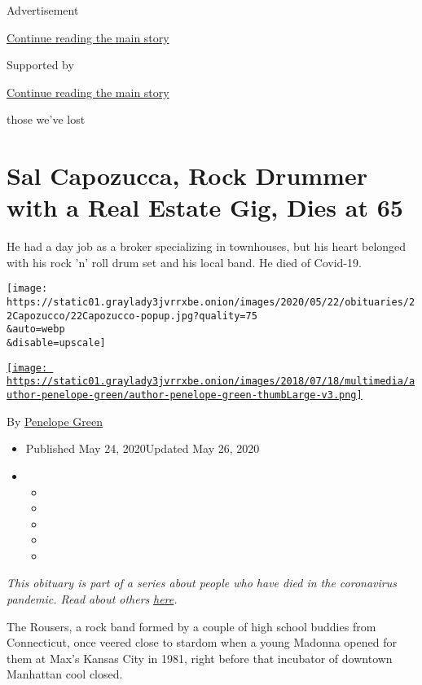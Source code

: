 Advertisement

\protect\hyperlink{after-top}{Continue reading the main story}

Supported by

\protect\hyperlink{after-sponsor}{Continue reading the main story}

those we've lost

\hypertarget{sal-capozucca-rock-drummer-with-a-real-estate-gig-dies-at-65}{%
\section{Sal Capozucca, Rock Drummer with a Real Estate Gig, Dies at
65}\label{sal-capozucca-rock-drummer-with-a-real-estate-gig-dies-at-65}}

He had a day job as a broker specializing in townhouses, but his heart
belonged with his rock 'n' roll drum set and his local band. He died of
Covid-19.

\texttt{[image: https://static01.graylady3jvrrxbe.onion/images/2020/05/22/obituaries/22Capozucco/22Capozucco-popup.jpg?quality=75\\\&auto=webp\\\&disable=upscale]}

\href{https://www.nytimes3xbfgragh.onion/by/penelope-green}{\texttt{[image: https://static01.graylady3jvrrxbe.onion/images/2018/07/18/multimedia/author-penelope-green/author-penelope-green-thumbLarge-v3.png]}}

By \href{https://www.nytimes3xbfgragh.onion/by/penelope-green}{Penelope
Green}

\begin{itemize}
\item
  Published May 24, 2020Updated May 26, 2020
\item
  \begin{itemize}
  \item
  \item
  \item
  \item
  \item
  \end{itemize}
\end{itemize}

\emph{This obituary is part of a series about people who have died in
the coronavirus pandemic. Read about others}
\href{https://www.nytimes3xbfgragh.onion/series/people-who-have-died-of-the-coronavirus}{\emph{here}}\emph{.}

The Rousers, a rock band formed by a couple of high school buddies from
Connecticut, once veered close to stardom when a young Madonna opened
for them at Max's Kansas City in 1981, right before that incubator of
downtown Manhattan cool closed.

